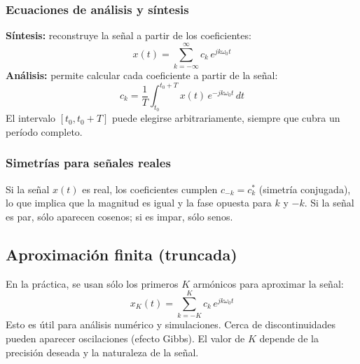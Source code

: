 \documentclass[
  11pt,
  letterpaper,
   addpoints,
   answers
  ]{exam}
\begin{document}
\subsubsection*{Ecuaciones de análisis y síntesis}
	\textbf{Síntesis:} reconstruye la señal a partir de los coeficientes:
\begin{equation}
  x(t) = \sum_{k=-\infty}^{\infty} c_k\,e^{jk\omega_0 t}
\end{equation}
	\textbf{Análisis:} permite calcular cada coeficiente a partir de la señal:
\begin{equation}
  c_k = \frac{1}{T}\int_{t_0}^{t_0+T} x(t)\,e^{-jk\omega_0 t}\,dt
\end{equation}
El intervalo $[t_0, t_0+T]$ puede elegirse arbitrariamente, siempre que cubra un período completo.

\subsubsection*{Simetrías para señales reales}
Si la señal $x(t)$ es real, los coeficientes cumplen $c_{-k}=c_k^{*}$ (simetría conjugada), lo que implica que la magnitud es igual y la fase opuesta para $k$ y $-k$. Si la señal es par, sólo aparecen cosenos; si es impar, sólo senos.

\subsection*{Aproximación finita (truncada)}
En la práctica, se usan sólo los primeros $K$ armónicos para aproximar la señal:
\begin{equation}
  x_K(t) = \sum_{k=-K}^{K} c_k\,e^{jk\omega_0 t}
\end{equation}
Esto es útil para análisis numérico y simulaciones. Cerca de discontinuidades pueden aparecer oscilaciones (efecto Gibbs). El valor de $K$ depende de la precisión deseada y la naturaleza de la señal.
\end{document}
